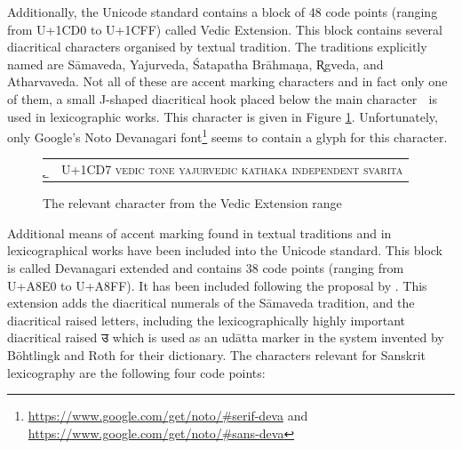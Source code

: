 Additionally, the Unicode standard contains a block of 48 code points (ranging from U+1CD0 to U+1CFF) called Vedic Extension. This block contains several diacritical characters organised by  textual tradition. The traditions explicitly named are Sāmaveda, Yajurveda, Śatapatha Brāhmaṇa, R̥gveda, and Atharvaveda. Not all of these are accent marking characters and in fact only one of them, a small J-shaped diacritical hook placed below the main character {\devfont क᳗} is used in lexicographic works. This character is given in Figure \ref{fig:j-shape}. Unfortunately, only Google’s Noto Devanagari font\footnote{\url{https://www.google.com/get/noto/\#serif-deva} and \url{https://www.google.com/get/noto/\#sans-deva}} seems to contain a glyph for this character.

\begin{figure}[!ht]
\begin{center}
\begin{tabular}{ll}
  {\devfont ᳗ }& U+1CD7 \textsc{vedic tone yajurvedic kathaka independent svarita}
\end{tabular}
\end{center}
\caption[The relevant character from the Vedic Extension range]{\label{fig:j-shape}The relevant character from the Vedic Extension range}
\end{figure}



Additional means of accent marking found in textual traditions and in lexicographical works have been included into the Unicode standard. This block is called Devanagari extended and contains 38 code points (ranging from U+A8E0 to U+A8FF). It has been included following the proposal by \citet{EversonScharf2007}. This extension adds the diacritical numerals of the Sāmaveda tradition, and the diacritical raised letters, including the lexicographically highly important diacritical raised {\devfont उ} which is used as an udātta marker in the system invented by Böhtlingk and Roth for their dictionary. The characters relevant for Sanskrit lexicography are the following four code points:

